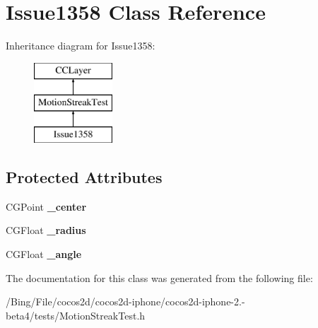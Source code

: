 \hypertarget{interface_issue1358}{\section{Issue1358 Class Reference}
\label{interface_issue1358}
}
Inheritance diagram for Issue1358\-:\begin{figure}[H]
\begin{center}
\leavevmode
\includegraphics[height=3.000000cm]{interface_issue1358}
\end{center}
\end{figure}
\subsection*{Protected Attributes}
\begin{DoxyCompactItemize}
\item 
\hypertarget{interface_issue1358_aa07c7568f0b982853a8e59d2d6e8fba2}{C\-G\-Point {\bfseries \-\_\-center}}\label{interface_issue1358_aa07c7568f0b982853a8e59d2d6e8fba2}

\item 
\hypertarget{interface_issue1358_a9503397d55dd40bfbf465e6b26deb1e2}{C\-G\-Float {\bfseries \-\_\-radius}}\label{interface_issue1358_a9503397d55dd40bfbf465e6b26deb1e2}

\item 
\hypertarget{interface_issue1358_ad09316076f6e273de7fa24e732cea42d}{C\-G\-Float {\bfseries \-\_\-angle}}\label{interface_issue1358_ad09316076f6e273de7fa24e732cea42d}

\end{DoxyCompactItemize}


The documentation for this class was generated from the following file\-:\begin{DoxyCompactItemize}
\item 
/\-Bing/\-File/cocos2d/cocos2d-\/iphone/cocos2d-\/iphone-\/2.-\/beta4/tests/Motion\-Streak\-Test.\-h\end{DoxyCompactItemize}

